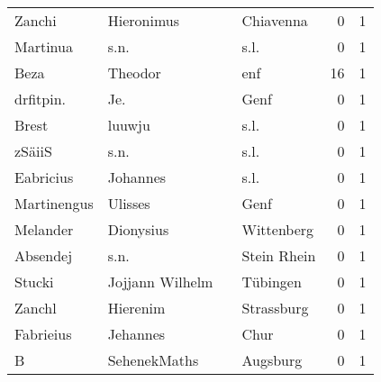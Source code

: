 \begin{tabular}{llllrr}
                   Zanchi &                         Hieronimus &             &                                   Chiavenna &          0 &         1 \\
                 Martinua &                               s.n. &             &                                        s.l. &          0 &         1 \\
                     Beza &                            Theodor &             &                                         enf &         16 &         1 \\
                drfitpin. &                                Je. &             &                                        Genf &          0 &         1 \\
                    Brest &                             luuwju &             &                                        s.l. &          0 &         1 \\
                   zSäiiS &                               s.n. &             &                                        s.l. &          0 &         1 \\
                Eabricius &                           Johannes &             &                                        s.l. &          0 &         1 \\
              Martinengus &                            Ulisses &             &                                        Genf &          0 &         1 \\
                 Melander &                          Dionysius &             &                                  Wittenberg &          0 &         1 \\
                 Absendej &                               s.n. &             &                                 Stein Rhein &          0 &         1 \\
                   Stucki &                    Jojjann Wilhelm &             &                                    Tübingen &          0 &         1 \\
                   Zanchl &                           Hierenim &             &                                  Strassburg &          0 &         1 \\
                Fabrieius &                           Jehannes &             &                                        Chur &          0 &         1 \\
                        B &                       SehenekMaths &             &                                    Augsburg &          0 &         1 \\

\end{tabular}
